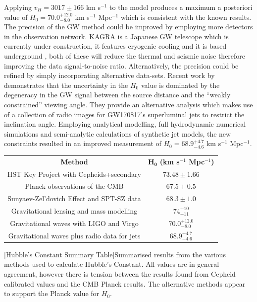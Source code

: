 \documentclass[12pt, onecolumn]{revtex4}    %
\begin{document}
Applying $v_H=3017\pm166$ km s$^{-1}$ to the model produces a maximum a posteriori value of $H_0=70.0^{+12.0}_{-8.0}$ km s$^{-1}$ Mpc$^{-1}$ which is consistent with the known results. The precision of the GW method could be improved by employing more detectors in the observation network. KAGRA is a Japanese GW telescope which is currently under construction, it features cryogenic cooling and it is based underground \citep{1742-6596-610-1-012016}, both of these will reduce the thermal and seismic noise therefore improving the data signal-to-noise ratio. Alternatively, the precision could be refined by simply incorporating alternative data-sets. Recent work by \cite{2018arXiv180610596H} demonstrates that the uncertainty in the \cite{2017Natur.551...85A} $H_0$ value is dominated by the degeneracy in the GW signal between the source distance and the ``weakly constrained'' viewing angle. They provide an alternative analysis which makes use of a collection of radio images for GW170817's superluminal jets to restrict the inclination angle. Employing analytical modelling, full hydrodynamic numerical simulations and semi-analytic calculations of synthetic jet models, the new constraints resulted in an improved measurement of  $H_0=68.9^{+4.7}_{-4.6}$ km s$^{-1}$ Mpc$^{-1}$. \\

\begin{center}
\renewcommand{\arraystretch}{1.0}
\begin{tabular}{c@{\hskip 20pt}c} 
 \hline
 \textbf{Method} & $\boldsymbol{H_0}$ \textbf{(km s$^{-1}$ Mpc$^{-1}$)} \\ [0.5ex] 
 HST Key Project with Cepheids+secondary & $73.48\pm1.66$ \\
 Planck observations of the CMB & $67.5\pm0.5$\\
 Sunyaev-Zel'dovich Effect and SPT-SZ data & $68.3\pm1.0$ \\
 Gravitational lensing and mass modelling & $74^{+10}_{-11}$ \\
 Gravitational waves with LIGO and Virgo & $70.0^{+12.0}_{-8.0}$ \\
 Gravitational waves plus radio data for jets & $68.9^{+4.7}_{-4.6}$ \\
 \hline
\end{tabular}
[Hubble's Constant Summary Table]{Summarised results from the various methods used to calculate Hubble's Constant. All values are in general agreement, however there is tension between the results found from Cepheid calibrated values and the CMB Planck results. The alternative methods appear to support the Planck value for $H_0$.}
\label{table:spectral_classification}
\end{center}
\end{document}
